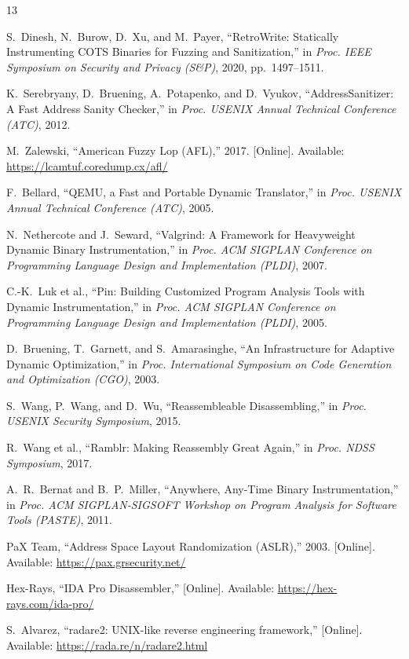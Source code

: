 \documentclass[10pt,a4paper]{article}
\begin{document}

\begin{thebibliography}{13}

S.~Dinesh, N.~Burow, D.~Xu, and M.~Payer, ``RetroWrite: Statically Instrumenting COTS Binaries for Fuzzing and Sanitization,'' in \textit{Proc. IEEE Symposium on Security and Privacy (S\&P)}, 2020, pp.~1497--1511.

K.~Serebryany, D.~Bruening, A.~Potapenko, and D.~Vyukov, ``AddressSanitizer: A Fast Address Sanity Checker,'' in \textit{Proc. USENIX Annual Technical Conference (ATC)}, 2012.

M.~Zalewski, ``American Fuzzy Lop (AFL),'' 2017. [Online]. Available: \url{https://lcamtuf.coredump.cx/afl/}

F.~Bellard, ``QEMU, a Fast and Portable Dynamic Translator,'' in \textit{Proc. USENIX Annual Technical Conference (ATC)}, 2005.

N.~Nethercote and J.~Seward, ``Valgrind: A Framework for Heavyweight Dynamic Binary Instrumentation,'' in \textit{Proc. ACM SIGPLAN Conference on Programming Language Design and Implementation (PLDI)}, 2007.

C.-K.~Luk et al., ``Pin: Building Customized Program Analysis Tools with Dynamic Instrumentation,'' in \textit{Proc. ACM SIGPLAN Conference on Programming Language Design and Implementation (PLDI)}, 2005.

D.~Bruening, T.~Garnett, and S.~Amarasinghe, ``An Infrastructure for Adaptive Dynamic Optimization,'' in \textit{Proc. International Symposium on Code Generation and Optimization (CGO)}, 2003.

S.~Wang, P.~Wang, and D.~Wu, ``Reassembleable Disassembling,'' in \textit{Proc. USENIX Security Symposium}, 2015.

R.~Wang et al., ``Ramblr: Making Reassembly Great Again,'' in \textit{Proc. NDSS Symposium}, 2017.

A.~R.~Bernat and B.~P.~Miller, ``Anywhere, Any-Time Binary Instrumentation,'' in \textit{Proc. ACM SIGPLAN-SIGSOFT Workshop on Program Analysis for Software Tools (PASTE)}, 2011.

PaX Team, ``Address Space Layout Randomization (ASLR),'' 2003. [Online]. Available: \url{https://pax.grsecurity.net/}

Hex-Rays, ``IDA Pro Disassembler,'' [Online]. Available: \url{https://hex-rays.com/ida-pro/}

S.~Alvarez, ``radare2: UNIX-like reverse engineering framework,'' [Online]. Available: \url{https://rada.re/n/radare2.html}


\end{thebibliography}
\end{document}
